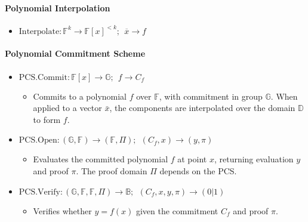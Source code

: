 \documentclass[
]{article}
\providecommand{\tightlist}{%
  \setlength{\itemsep}{0pt}\setlength{\parskip}{0pt}}
\begin{document}
\hypertarget{polynomial-interpolation}{%
\paragraph{Polynomial Interpolation}\label{polynomial-interpolation}}

\begin{itemize}
\tightlist
\item
  \(\text{Interpolate}: \mathbb{F}^k \rightarrow \mathbb{F}[x]^{< k};\ \ \overline{x} \rightarrow f\)
\end{itemize}

\hypertarget{polynomial-commitment-scheme}{%
\paragraph{Polynomial Commitment
Scheme}\label{polynomial-commitment-scheme}}

\begin{itemize}
\tightlist
\item
  \(\text{PCS.Commit}: \mathbb{F}[x] \rightarrow \mathbb{G};\ \ f \rightarrow C_f\)

  \begin{itemize}
  \tightlist
  \item
    Commits to a polynomial \(f\) over \(\mathbb{F}\), with commitment
    in group \(\mathbb{G}\). When applied to a vector \(\bar{x}\), the
    components are interpolated over the domain \(\mathbb{D}\) to form
    \(f\).
  \end{itemize}
\item
  \(\text{PCS.Open}: (\mathbb{G}, \mathbb{F}) \rightarrow (\mathbb{F}, \Pi);\ \ (C_f, x) \rightarrow (y,\pi)\)

  \begin{itemize}
  \tightlist
  \item
    Evaluates the committed polynomial \(f\) at point \(x\), returning
    evaluation \(y\) and proof \(\pi\). The proof domain \(\Pi\) depends
    on the PCS.
  \end{itemize}
\item
  \(\text{PCS.Verify}: (\mathbb{G}, \mathbb{F}, \mathbb{F}, \Pi) \rightarrow \mathbb{B};\ \ (C_f,x,y ,\pi) \rightarrow (0|1)\)

  \begin{itemize}
  \tightlist
  \item
    Verifies whether \(y = f(x)\) given the commitment \(C_f\) and proof
    \(\pi\).
  \end{itemize}
\end{itemize}
\end{document}

